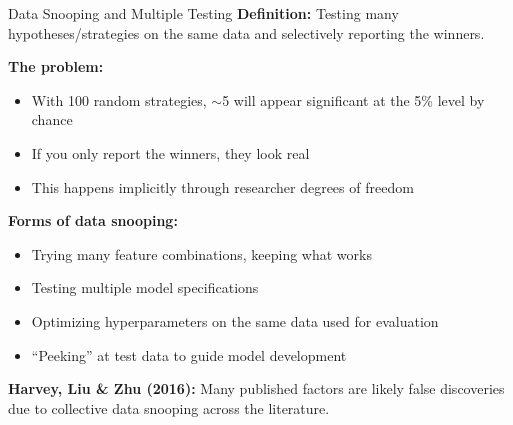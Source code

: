 \documentclass[10pt]{beamer}
\begin{document}
\begin{frame}{Data Snooping and Multiple Testing}
  \textbf{Definition:} Testing many hypotheses/strategies on the same data and selectively reporting the winners.
  
  \vspace{1em}
  \textbf{The problem:}
  \begin{itemize}
    \item With 100 random strategies, $\sim$5 will appear significant at the 5\% level by chance
    \item If you only report the winners, they look real
    \item This happens implicitly through researcher degrees of freedom
  \end{itemize}
  
  \vspace{1em}
  \textbf{Forms of data snooping:}
  \begin{itemize}
    \item Trying many feature combinations, keeping what works
    \item Testing multiple model specifications
    \item Optimizing hyperparameters on the same data used for evaluation
    \item ``Peeking'' at test data to guide model development
  \end{itemize}
  
  \vspace{0.5em}
  \textbf{Harvey, Liu \& Zhu (2016):} Many published factors are likely false discoveries due to collective data snooping across the literature.
\end{frame}
\end{document}
